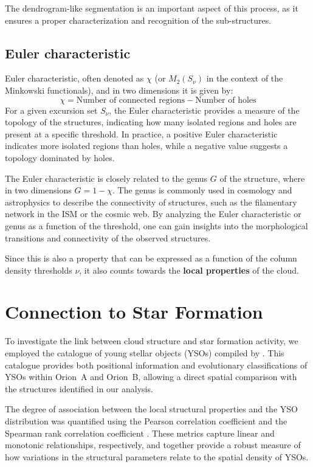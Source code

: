 The dendrogram-like segmentation is an important aspect of this process, as it ensures a proper characterization and recognition of the sub-structures. 

\subsection{Euler characteristic}

Euler characteristic, often denoted as $\chi$ (or $M_2(S_{\nu})$ in the context of the Minkowski functionals), and in two dimensions it is given by:
\begin{equation}
    \chi = \text{Number of connected regions} - \text{Number of holes}
\end{equation}
For a given excursion set $S_{\nu}$, the Euler characteristic provides a measure of the topology of the structures, indicating how many isolated regions and holes are present at a specific threshold. In practice, a positive Euler characteristic indicates more isolated regions than holes, while a negative value suggests a topology dominated by holes.

The Euler characteristic is closely related to the genus $G$ of the structure, where in two dimensions $G = 1 - \chi$. The genus is commonly used in cosmology and astrophysics to describe the connectivity of structures, such as the filamentary network in the ISM or the cosmic web. By analyzing the Euler characteristic or genus as a function of the threshold, one can gain insights into the morphological transitions and connectivity of the observed structures.

Since this is also a property that can be expressed as a function of the column density thresholds $\nu$, it also counts towards the \textbf{local properties} of the cloud.
\section{Connection to Star Formation}

To investigate the link between cloud structure and star formation activity, we employed the catalogue of young stellar objects (YSOs) compiled by \cite{megeath2012catalogue}.  
This catalogue provides both positional information and evolutionary classifications of YSOs within Orion~A and Orion~B, allowing a direct spatial comparison with the structures identified in our analysis.

The degree of association between the local structural properties and the YSO distribution was quantified using the Pearson correlation coefficient \cite{pearson1895vii} and the Spearman rank correlation coefficient \cite{sedgwick2014spearman}.  
These metrics capture linear and monotonic relationships, respectively, and together provide a robust measure of how variations in the structural parameters relate to the spatial density of YSOs.

